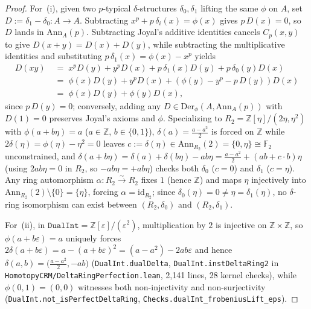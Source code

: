 \documentclass[10pt,twoside,openright]{book}
\theoremstyle{crmplain}
\theoremstyle{crmdef}
\theoremstyle{crmremark}
\begin{document}
\begin{proof}
For~(i), given two $p$-typical $\delta$-structures $\delta_0, \delta_1$ lifting the same $\phi$ on $A$, set $D := \delta_1 - \delta_0 : A \to A$. Subtracting $x^p + p\,\delta_i(x) = \phi(x)$ gives $p\,D(x) = 0$, so $D$ lands in $\mathrm{Ann}_A(p)$. Subtracting Joyal's additive identities cancels $C_p(x, y)$ to give $D(x + y) = D(x) + D(y)$, while subtracting the multiplicative identities and substituting $p\,\delta_1(x) = \phi(x) - x^p$ yields
\[
  \begin{aligned}
    D(xy) &\;=\; x^p D(y) + y^p D(x) + p\,\delta_1(x) D(y) + p\,\delta_0(y) D(x) \\
    &\;=\; \phi(x) D(y) + y^p D(x) + (\phi(y) - y^p - p\,D(y)) D(x) \\
    &\;=\; \phi(x) D(y) + \phi(y) D(x),
  \end{aligned}
\]
since $p\,D(y) = 0$; conversely, adding any $D \in \mathrm{Der}_\phi(A, \mathrm{Ann}_A(p))$ with $D(1) = 0$ preserves Joyal's axioms and $\phi$. Specializing to $R_2 = \mathbb{Z}[\eta]/(2\eta, \eta^2)$ with $\phi(a + b\eta) = a$ ($a \in \mathbb{Z}$, $b \in \{0, 1\}$), $\delta(a) = \frac{a - a^2}{2}$ is forced on $\mathbb{Z}$ while $2\delta(\eta) = \phi(\eta) - \eta^2 = 0$ leaves $c := \delta(\eta) \in \mathrm{Ann}_{R_2}(2) = \{0, \eta\} \cong \mathbb{F}_2$ unconstrained, and $\delta(a + b\eta) = \delta(a) + \delta(b\eta) - ab\eta = \frac{a - a^2}{2} + (ab + c\cdot b)\eta$ (using $2ab\eta = 0$ in $R_2$, so $-ab\eta = +ab\eta$) checks both $\delta_0$ ($c = 0$) and $\delta_1$ ($c = \eta$). Any ring automorphism $\alpha : R_2 \xrightarrow{\sim} R_2$ fixes $1$ (hence $\mathbb{Z}$) and maps $\eta$ injectively into $\mathrm{Ann}_{R_2}(2) \setminus \{0\} = \{\eta\}$, forcing $\alpha = \mathrm{id}_{R_2}$; since $\delta_0(\eta) = 0 \neq \eta = \delta_1(\eta)$, no $\delta$-ring isomorphism can exist between $(R_2, \delta_0)$ and $(R_2, \delta_1)$.

For~(ii), in $\mathtt{DualInt} = \mathbb{Z}[\varepsilon]/(\varepsilon^2)$, multiplication by $2$ is injective on $\mathbb{Z} \times \mathbb{Z}$, so $\phi(a + b\varepsilon) = a$ uniquely forces $2\delta(a + b\varepsilon) = a - (a + b\varepsilon)^2 = (a - a^2) - 2ab\varepsilon$ and hence $\delta(a, b) = \bigl(\frac{a - a^2}{2}, -ab\bigr)$ (\texttt{DualInt.dualDelta}, \texttt{DualInt.instDeltaRing2} in \texttt{HomotopyCRM/\allowbreak DeltaRing\allowbreak Perfection.lean}, 2,141 lines, 28 kernel checks), while $\phi(0, 1) = (0, 0)$ witnesses both non-injectivity and non-surjectivity (\texttt{DualInt.not\_isPerfectDeltaRing}, \texttt{Checks.dualInt\_frobeniusLift\_eps}).
\end{proof}
\end{document}
